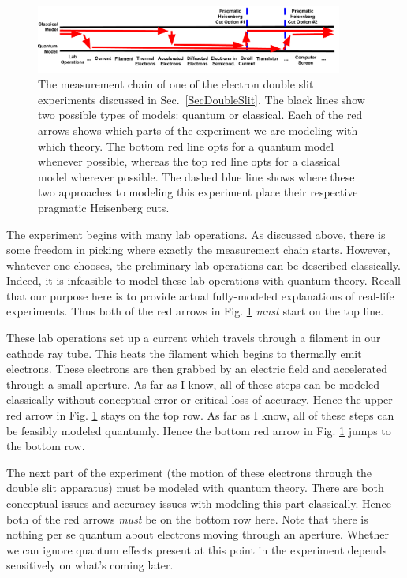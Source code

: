 \documentclass[12pt,prd,superscriptaddress,floatfix,amsmath,amssymb,amsfonts,nofootinbib]{revtex4-2}
\begin{document}
\begin{figure}[t]
\includegraphics[width=0.9\textwidth]{Figures/HeisenbergCut2.pdf}
\caption{The measurement chain of one of the electron double slit experiments discussed in Sec.~\ref{SecDoubleSlit}. The black lines show two possible types of models: quantum or classical. Each of the red arrows shows which parts of the experiment we are modeling with which theory. The bottom red line opts for a quantum model whenever possible, whereas the top red line opts for a classical model wherever possible. The dashed blue line shows where these two approaches to modeling this experiment place their respective pragmatic Heisenberg cuts.}\label{FigHCut2}
\end{figure}

The experiment begins with many lab operations. As discussed above, there is some freedom in picking where exactly the measurement chain starts. However, whatever one chooses, the preliminary lab operations can be described classically. Indeed, it is infeasible to model these lab operations with quantum theory. Recall that our purpose here is to provide actual fully-modeled explanations of real-life experiments. Thus both of the red arrows in Fig. \ref{FigHCut2} \textit{must} start on the top line.

These lab operations set up a current which travels through a filament in our cathode ray tube. This heats the filament which begins to thermally emit electrons. These electrons are then grabbed by an electric field and accelerated through a small aperture. As far as I know, all of these steps can be modeled classically without conceptual error or critical loss of accuracy. Hence the upper red arrow in Fig. \ref{FigHCut2} stays on the top row. As far as I know, all of these steps can be feasibly modeled quantumly. Hence the bottom red arrow in Fig. \ref{FigHCut2} jumps to the bottom row.

The next part of the experiment (the motion of these electrons through the double slit apparatus) must be modeled with quantum theory. There are both conceptual issues and accuracy issues with modeling this part classically. Hence both of the red arrows \textit{must} be on the bottom row here. Note that there is nothing per se quantum about electrons moving through an aperture. Whether we can ignore quantum effects present at this point in the experiment depends sensitively on what's coming later. 
\end{document}
